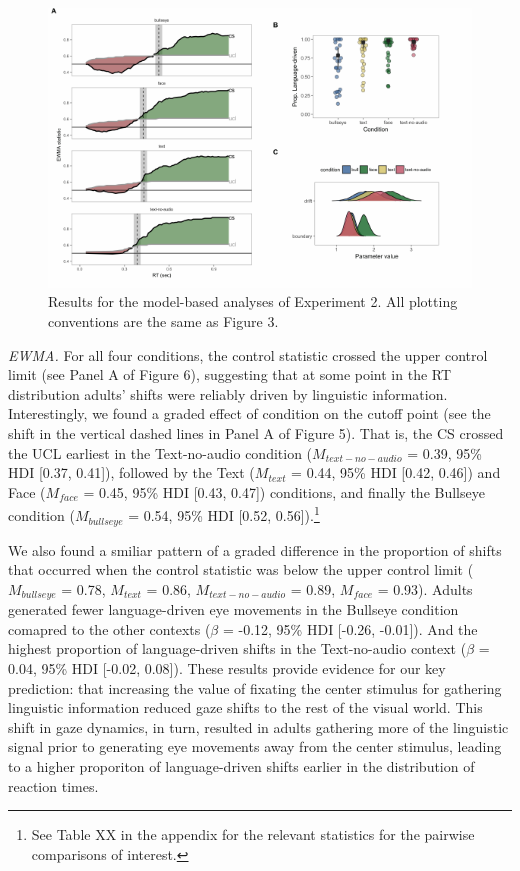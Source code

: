 \documentclass[english,floatsintext,man]{apa6}
\begin{document}
\begin{figure}[!ht]

{\centering \includegraphics[width=0.9\linewidth]{figs/text-model-plots-1} 

}

\caption{Results for the model-based analyses of Experiment 2. All plotting conventions are the same as Figure 3.}\label{fig:text-model-plots}
\end{figure}

\emph{EWMA.} For all four conditions, the control statistic crossed the
upper control limit (see Panel A of Figure 6), suggesting that at some
point in the RT distribution adults' shifts were reliably driven by
linguistic information. Interestingly, we found a graded effect of
condition on the cutoff point (see the shift in the vertical dashed
lines in Panel A of Figure 5). That is, the CS crossed the UCL earliest
in the Text-no-audio condition (\(M_{text-no-audio}\) = 0.39, 95\% HDI
{[}0.37, 0.41{]}), followed by the Text (\(M_{text}\) = 0.44, 95\% HDI
{[}0.42, 0.46{]}) and Face (\(M_{face}\) = 0.45, 95\% HDI {[}0.43,
0.47{]}) conditions, and finally the Bullseye condition
(\(M_{bullseye}\) = 0.54, 95\% HDI {[}0.52, 0.56{]}).\footnote{See Table
  XX in the appendix for the relevant statistics for the pairwise
  comparisons of interest.}

We also found a smiliar pattern of a graded difference in the proportion
of shifts that occurred when the control statistic was below the upper
control limit (\(M_{bullseye}\) = 0.78, \(M_{text}\) = 0.86,
\(M_{text-no-audio}\) = 0.89, \(M_{face}\) = 0.93). Adults generated
fewer language-driven eye movements in the Bullseye condition comapred
to the other contexts (\(\beta\) = -0.12, 95\% HDI {[}-0.26, -0.01{]}).
And the highest proportion of language-driven shifts in the
Text-no-audio context (\(\beta\) = 0.04, 95\% HDI {[}-0.02, 0.08{]}).
These results provide evidence for our key prediction: that increasing
the value of fixating the center stimulus for gathering linguistic
information reduced gaze shifts to the rest of the visual world. This
shift in gaze dynamics, in turn, resulted in adults gathering more of
the linguistic signal prior to generating eye movements away from the
center stimulus, leading to a higher proporiton of language-driven
shifts earlier in the distribution of reaction times.
\end{document}
